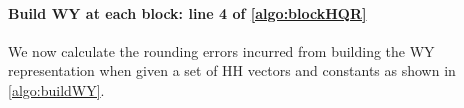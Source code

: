 \documentclass[review,onefignum,onetabnum]{siamart190516}
\newcommand{\bb}[1]{\mathbf{#1}}
\newcommand{\fl}{\mathrm{fl}}
\begin{document}
\paragraph{Build WY at each block: line 4 of \cref{algo:blockHQR}}
We now calculate the rounding errors incurred from building the WY representation when given a set of HH vectors and constants as shown in \cref{algo:buildWY}.
\end{document}

